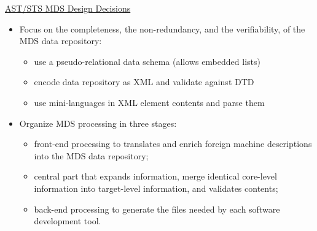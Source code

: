 \documentclass[a4]{seminar}
\begin{document}
\begin{slide}

\begin{center} \underline{AST/STS MDS Design Decisions} \end{center}

\begin{itemize}

\item Focus on the completeness, the non-redundancy, and the verifiability, of
the MDS data repository:
  \begin{itemize}
    \item use a pseudo-relational data schema (allows embedded lists)
    \item encode data repository as XML and validate against DTD
    \item use mini-languages in XML element contents and parse them
  \end{itemize}

\item Organize MDS processing in three stages:
  \begin{itemize}
    \item front-end processing to translates and enrich foreign machine
    descriptions into the MDS data repository;
    \item central part that expands information, merge identical core-level
    information into target-level information, and validates contents;
    \item back-end processing to generate the files needed by each software
    development tool.
  \end{itemize}

\end{itemize}

\end{slide}
\end{document}
